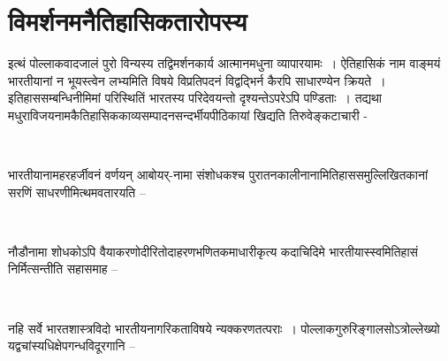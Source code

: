 \vspace{-.5cm}

\section*{विमर्शनमनैतिहासिकतारोपस्य}

इत्थं पोल्लाकवादजालं पुरो विन्यस्य तद्विमर्शनकार्य आत्मानमधुना व्यापारयामः~। ऐतिहासिकं नाम वाङ्मयं भारतीयानां न भूयस्त्वेन लभ्यमिति विषये विप्रतिपदनं विद्वद्भिर्न कैरपि साधारण्येन क्रियते~। इतिहाससम्बन्धिनीमिमां परिस्थितिं भारतस्य परिदेवयन्तो दृश्यन्तेऽपरेऽपि पण्डिताः~। तद्यथा मधुराविजयनामकैतिहासिककाव्यसम्पादनसन्दर्भीयपीठिकायां खिद्यति तिरुवेङ्कटाचारी -

\begin{myquote}

~\hfill {}
\end{myquote}

भारतीयानामहरहर्जीवनं वर्णयन् आबोयर्-नामा संशोधकश्च पुरातनकालीनानामितिहाससमुल्लिखितकानां सरणिं साधरणीमित्थमवतारयति –

\begin{myquote}

\vskip -8pt

~\hfill {}
\end{myquote}

\vfill\eject

नौडौनामा शोधकोऽपि वैयाकरणोदीरितोदाहरणभणितकमाधारीकृत्य कदाचिदिमे भारतीयास्स्वमितिहासं निर्मित्सन्तीति सहासमाह –

\begin{myquote}

~\hfill {}
\end{myquote}

नहि सर्वे भारतशास्त्रविदो  भारतीयनागरिकताविषये न्यक्करणतत्पराः~। पोल्लाकगुरुरिङ्गालसोऽत्रोल्लेख्यो यद्वचांस्यधिक्षेपगन्धविदूरगानि –

